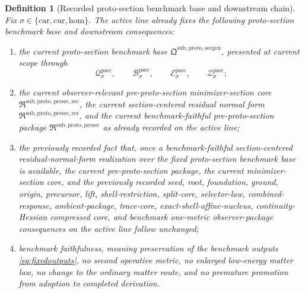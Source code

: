 \documentclass[11pt]{article}
\newcommand{\Car}{\mathrm{car}}
\newcommand{\Cur}{\mathrm{cur}}
\newcommand{\Hom}{\mathrm{hom}}
\newcommand{\ProtoSectionPackage}{\mathfrak Q^{\mathrm{sub,proto,secgen}}}
\newcommand{\ProtoSectionState}[1]{\mathcal Q_{#1}^{\mathrm{psec}}}
\newcommand{\ProtoSectionBody}[1]{\mathcal B_{#1}^{\mathrm{psec}}}
\newcommand{\ProtoSectionFunctional}[1]{\mathscr E_{#1}^{\mathrm{psec}}}
\newcommand{\ProtoSectionShell}[1]{\mathcal Z_{#1}^{\mathrm{psec}}}
\newcommand{\PreProtoSectionPackage}{\mathfrak R^{\mathrm{sub,proto,presec}}}
\newcommand{\PreProtoSectionMinSectionCore}{\mathfrak R^{\mathrm{sub,proto,presec,sec}}}
\newcommand{\PreProtoSectionResidualPackage}{\mathfrak R^{\mathrm{sub,proto,presec,res}}}
\newtheorem{definition}{Definition}
\begin{document}
\begin{definition}[Recorded proto-section benchmark base and downstream chain]
\label{def:downstream}
Fix \(\sigma\in\{\Car,\Cur,\Hom\}\). The active line already fixes the following proto-section benchmark base and downstream consequences:
\begin{enumerate}
    \item the current proto-section benchmark base \(\ProtoSectionPackage\), presented at current scope through
    \[
    \ProtoSectionState{\sigma},\qquad
    \ProtoSectionBody{\sigma},\qquad
    \ProtoSectionFunctional{\sigma},\qquad
    \ProtoSectionShell{\sigma};
    \]
    \item the current observer-relevant pre-proto-section minimizer-section core \(\PreProtoSectionMinSectionCore\), the current section-centered residual normal form \(\PreProtoSectionResidualPackage\), and the current benchmark-faithful pre-proto-section package \(\PreProtoSectionPackage\) as already recorded on the active line;
    \item the previously recorded fact that, once a benchmark-faithful section-centered residual-normal-form realization over the fixed proto-section benchmark base is available, the current pre-proto-section package, the current minimizer-section core, and the previously recorded seed, root, foundation, ground, origin, precursor, lift, shell-restriction, split-core, selector-law, combined-response, ambient-package, trace-core, exact-shell-affine-nucleus, continuity-Hessian compressed core, and benchmark one-metric observer-package consequences on the active line follow unchanged;
    \item benchmark faithfulness, meaning preservation of the benchmark outputs \eqref{eq:fixedoutputs}, no second operative metric, no enlarged low-energy matter law, no change to the ordinary matter route, and no premature promotion from adoption to completed derivation.
\end{enumerate}
\end{definition}
\end{document}
